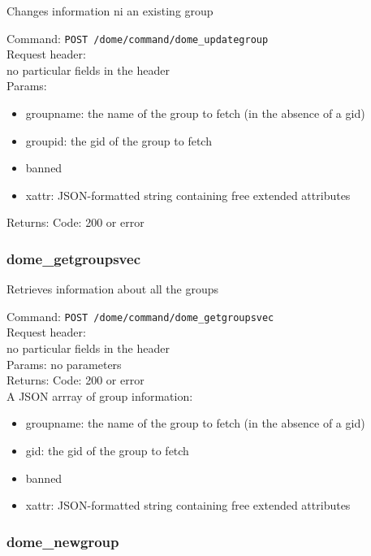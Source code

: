\documentclass[a4paper,10pt]{scrreprt}
\begin{document}
Changes information ni an existing group

Command:
\lstinline"POST /dome/command/dome_updategroup"\\

Request header:\\
no particular fields in the header\\

Params:
\begin{itemize}
 \item groupname: the name of the group to fetch (in the absence of a gid)
 \item groupid: the gid of the group to fetch
 \item banned
 \item xattr: JSON-formatted string containing free extended attributes
\end{itemize}

Returns:
Code: 200 or error



\subsubsection{dome\_getgroupsvec}

Retrieves information about all the groups

Command:
\lstinline"POST /dome/command/dome_getgroupsvec"\\

Request header:\\
no particular fields in the header\\

Params:
no parameters\\

Returns:
Code: 200 or error\\
A JSON arrray of group information:\\
\begin{itemize}
 \item groupname: the name of the group to fetch (in the absence of a gid)
 \item gid: the gid of the group to fetch
 \item banned
 \item xattr: JSON-formatted string containing free extended attributes
\end{itemize}




\subsubsection{dome\_newgroup}
\end{document}
